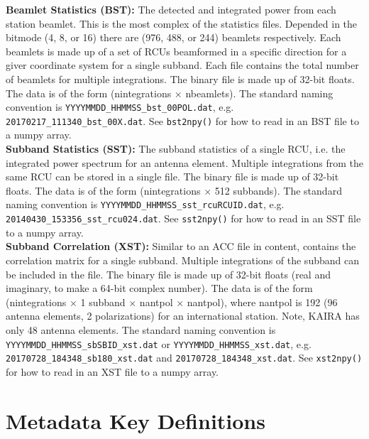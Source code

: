 \documentclass[10pt,a4paper]{article}
\begin{document}
\noindent\textbf{Beamlet Statistics (BST):} The detected and integrated power
from each station beamlet. This is the most complex of the statistics files.
Depended in the bitmode (4, 8, or 16) there are (976, 488, or 244) beamlets
respectively. Each beamlets is made up of a set of RCUs beamformed in a specific
direction for a giver coordinate system for a single subband. Each file contains
the total number of beamlets for multiple integrations. The binary file is made
up of 32-bit floats. The data is of the form (nintegrations $\times$ nbeamlets).
The standard naming convention is \texttt{YYYYMMDD\_HHMMSS\_bst\_00POL.dat}, e.g.
\texttt{20170217\_111340\_bst\_00X.dat}.  See \texttt{bst2npy()} for how to read in
an BST file to a numpy array.
\\

\noindent\textbf{Subband Statistics (SST):} The subband statistics of a single
RCU, i.e. the integrated power spectrum for an antenna element. Multiple
integrations from the same RCU can be stored in a single file. The binary file
is made up of 32-bit floats. The data is of the form (nintegrations $\times$ 512
subbands). The standard naming convention is
\texttt{YYYYMMDD\_HHMMSS\_sst\_rcuRCUID.dat}, e.g.
\texttt{20140430\_153356\_sst\_rcu024.dat}.  See \texttt{sst2npy()} for how to
read in an SST file to a numpy array.
\\

\noindent\textbf{Subband Correlation (XST):} Similar to an ACC file in content,
contains the correlation matrix for a single subband. Multiple integrations of
the subband can be included in the file. The binary file is made up of 32-bit
floats (real and imaginary, to make a 64-bit complex number). The data is of the
form (nintegrations $\times$ 1 subband $\times$ nantpol $\times$ nantpol), where
nantpol is 192 (96 antenna elements, 2 polarizations) for an international
station. Note, KAIRA has only 48 antenna elements.  The standard naming
convention is \texttt{YYYYMMDD\_HHMMSS\_sbSBID\_xst.dat} or
\texttt{YYYYMMDD\_HHMMSS\_xst.dat}, e.g. \\
\texttt{20170728\_184348\_sb180\_xst.dat} and
\texttt{20170728\_184348\_xst.dat}.  See \texttt{xst2npy()} for how to read in
an XST file to a numpy array.
\\


\section{Metadata Key Definitions}
\end{document}
